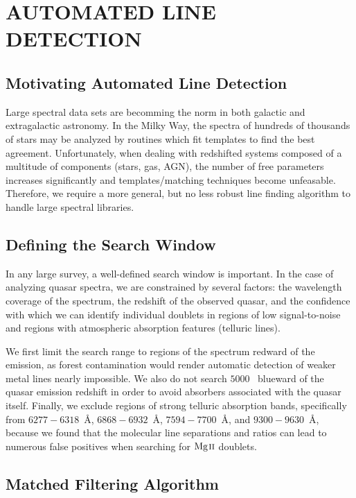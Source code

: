 \section{\MakeUppercase{Automated Line Detection}}
\label{chp3}

\subsection{Motivating Automated Line Detection}
\label{ch3:motivation}

Large spectral data sets are becomming the norm in both galactic and extragalactic astronomy. In the Milky Way, the spectra of hundreds of thousands of stars may be analyzed by routines which fit templates to find the best agreement. Unfortunately, when dealing with redshifted systems composed of a multitude of components (stars, gas, AGN), the number of free parameters increases significantly and templates/matching techniques become unfeasable. Therefore, we require a more general, but no less robust line finding algorithm to handle large spectral libraries.

\subsection{Defining the Search Window}
\label{ch3:window}

In any large survey, a well-defined search window is important. In the case of analyzing quasar spectra, we are constrained by several factors: the wavelength coverage of the spectrum, the redshift of the observed quasar, and the confidence with which we can identify individual doublets in regions of low signal-to-noise and regions with atmospheric absorption features (telluric lines).

We first limit the search range to regions of the spectrum redward of the {\Lya} emission, as {\Lya} forest contamination would render automatic detection of weaker metal lines nearly impossible. We also do not search $5000$~{\kms} blueward of the quasar emission redshift in order to avoid absorbers associated with the quasar itself. Finally, we exclude regions of strong telluric absorption bands, specifically from $6277 - 6318$~{\AA}, $6868 - 6932$~{\AA}, $7594 - 7700$~{\AA}, and $9300 - 9630$~{\AA}, because we found that the molecular line separations and ratios can lead to numerous false positives when searching for ${\hbox{{\rm Mg}\kern 0.1em{\sc ii}}}$ doublets.

\subsection{Matched Filtering Algorithm}
\label{ch3:detection}

